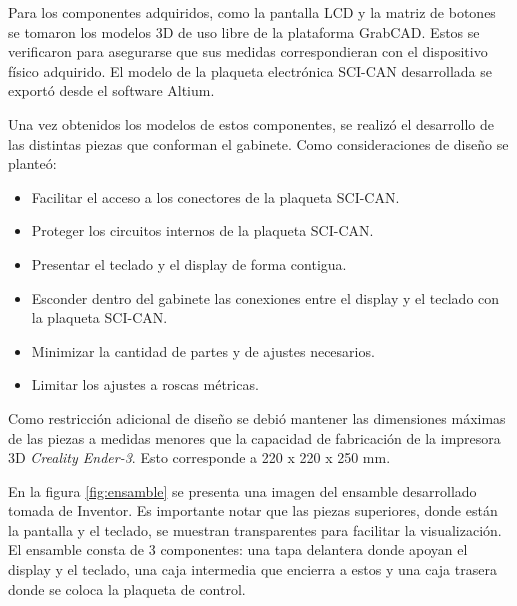 Para los componentes adquiridos, como la pantalla LCD y la matriz de botones se tomaron los modelos 3D de uso libre de la plataforma GrabCAD\citep{web_grabcad}. Estos se verificaron para asegurarse que sus medidas correspondieran con el dispositivo físico adquirido. El modelo de la plaqueta electrónica SCI-CAN desarrollada se exportó desde el software Altium.

Una vez obtenidos los modelos de estos componentes, se realizó el desarrollo de las distintas piezas que conforman el gabinete. Como consideraciones de diseño se planteó:

\begin{itemize}
	\item Facilitar el acceso a los conectores de la plaqueta SCI-CAN.
	\item Proteger los circuitos internos de la plaqueta SCI-CAN.
	\item Presentar el teclado y el display de forma contigua.
	\item Esconder dentro del gabinete las conexiones entre el display y el teclado con la plaqueta SCI-CAN.
	\item Minimizar la cantidad de partes y de ajustes necesarios.
	\item Limitar los ajustes a roscas métricas.
\end{itemize}

Como restricción adicional de diseño se debió mantener las dimensiones máximas de las piezas a medidas menores que la capacidad de fabricación de la impresora 3D \textit{Creality Ender-3}\citep{web_ender3}. Esto corresponde a 220 x 220 x 250 mm.

En la figura \ref{fig:ensamble} se presenta una imagen del ensamble desarrollado tomada de Inventor. Es importante notar que las piezas superiores, donde están la pantalla y el teclado, se muestran transparentes para facilitar la visualización. El ensamble consta de 3 componentes: una tapa delantera donde apoyan el display y el teclado, una caja intermedia que encierra a estos y una caja trasera donde se coloca la plaqueta de control.

